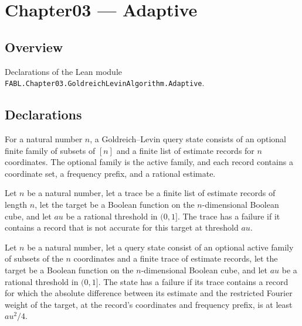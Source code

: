 \chapter{Chapter03 — Adaptive}
\section{Overview}

Declarations of the Lean module \texttt{FABL.Chapter03.GoldreichLevinAlgorithm.Adaptive}.

\section{Declarations}

\begin{definition}
\label{FABL.GoldreichLevinQueryState}
\leanok
{}
For a natural number $n$, a Goldreich–Levin query state consists of an optional finite
family of subsets of $[n]$ and a finite list of estimate records for $n$ coordinates.
The optional family is the active family, and each record contains a coordinate set, a
frequency prefix, and a rational estimate.
\end{definition}

\begin{definition}
\label{FABL.GoldreichLevinEstimateTrace.HasFailure}
\leanok
{}
Let $n$ be a natural number, let a trace be a finite list of estimate records of length
$n$, let the target be a Boolean function on the $n$-dimensional Boolean cube, and let
$	au$ be a rational threshold in $(0,1]$. The trace has a failure if it contains a
record that is not accurate for this target at threshold $	au$.
\end{definition}

\begin{definition}
\label{FABL.GoldreichLevinQueryState.HasFailure}
\leanok
{}
Let $n$ be a natural number, let a query state consist of an optional active family of
subsets of the $n$ coordinates and a finite trace of estimate records, let the target be
a Boolean function on the $n$-dimensional Boolean cube, and let $	au$ be a rational
threshold in $(0,1]$. The state has a failure if its trace contains a record for which
the absolute difference between its estimate and the restricted Fourier weight of the
target, at the record's coordinates and frequency prefix, is at least $	au^2/4$.
\end{definition}

